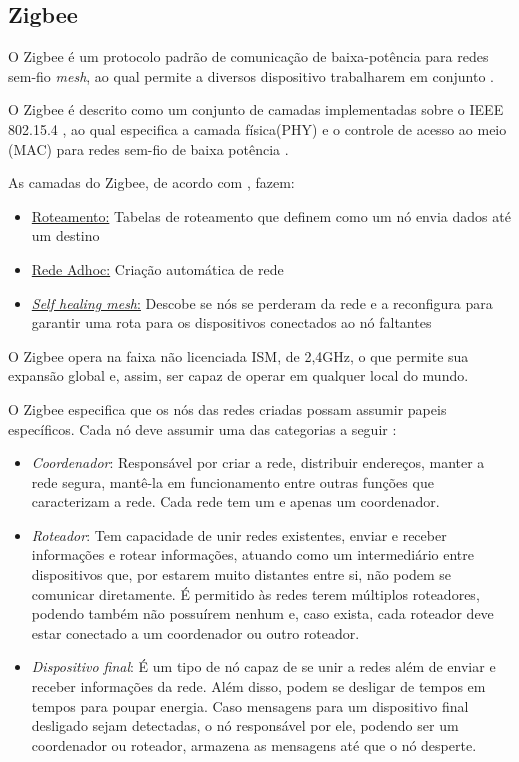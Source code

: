 \subsection{Zigbee}

O Zigbee é um protocolo padrão de comunicação de baixa-potência para redes sem-fio \textit{mesh}, ao qual permite a diversos dispositivo trabalharem em conjunto \cite{Faludi2011}.

O Zigbee é descrito como um conjunto de camadas implementadas sobre o IEEE 802.15.4 \cite{Faludi2011}, ao qual especifica a camada física(PHY) e o controle de acesso ao meio (MAC) para redes sem-fio de baixa potência \cite{IEEE2011}.

As camadas do Zigbee, de acordo com \cite{Faludi2011}, fazem:

\begin{itemize} \parskip -4pt
	\item \underline{Roteamento:} Tabelas de roteamento que definem como um nó envia dados até um 
	destino
	\item \underline{Rede Adhoc:} Criação automática de rede
	\item \underline{\textit{Self healing mesh}:} Descobe se nós se perderam da rede e a 
	reconfigura para garantir uma rota para os dispositivos conectados ao nó faltantes
\end{itemize}

O Zigbee opera na faixa não licenciada ISM, de 2,4GHz, o que permite sua expansão global e, assim, ser capaz de operar em qualquer local do mundo.

O Zigbee especifica que os nós das redes criadas possam assumir papeis específicos. Cada nó deve 
assumir uma das categorias a seguir \cite{Faludi2011}:

\begin{itemize} \parskip -4pt
	\item \textit{Coordenador}: Responsável por criar a rede, distribuir endereços, manter a rede segura, 
	mantê-la em funcionamento entre outras funções que caracterizam a rede. Cada rede tem um e 
	apenas um coordenador.
	\item \textit{Roteador}: Tem capacidade de unir redes existentes, enviar e receber informações e rotear 
	informações, atuando como um intermediário entre dispositivos que, por estarem muito distantes 
	entre si, não podem se comunicar diretamente. É permitido às redes terem múltiplos roteadores, 
	podendo também não possuírem nenhum e, caso exista, cada roteador deve estar conectado a um 
	coordenador ou outro roteador.
	\item \textit{Dispositivo final}: É um tipo de nó capaz de se unir a redes além de enviar e receber 
	informações da rede. Além disso, podem se desligar de tempos em tempos para poupar energia. 
	Caso mensagens para um dispositivo final desligado sejam detectadas, o nó responsável por ele, 
	podendo ser um coordenador ou roteador, armazena as mensagens até que o nó desperte.
\end{itemize}

